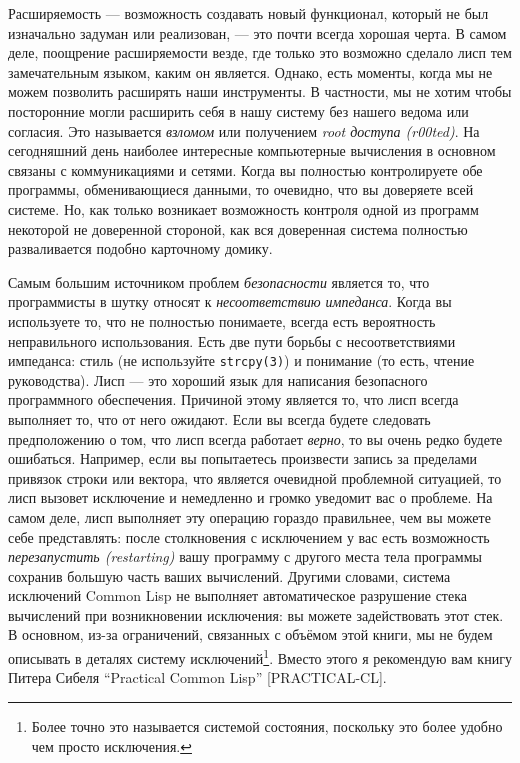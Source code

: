 Расширяемость --- возможность создавать новый функционал, который не был изначально задуман или реализован, --- это почти всегда хорошая черта. В самом деле, поощрение расширяемости везде, где только это возможно сделало лисп тем замечательным языком, каким он является. Однако, есть моменты, когда мы не можем позволить расширять наши инструменты. В частности, мы не хотим чтобы посторонние могли расширить себя в нашу систему без нашего ведома или согласия. Это называется \emph{взломом} или получением \emph{root доступа (r00ted)}. На сегодняшний день наиболее интересные компьютерные вычисления в основном связаны с коммуникациями и сетями. Когда вы полностью контролируете обе программы, обменивающиеся данными, то очевидно, что вы доверяете всей системе. Но, как только возникает возможность контроля одной из программ некоторой не доверенной стороной, как вся доверенная система полностью разваливается подобно карточному домику.

Самым большим источником проблем \emph{безопасности} является то, что программисты в шутку относят к \emph{несоответствию импеданса}. Когда вы используете то, что не полностью понимаете, всегда есть вероятность неправильного использования. Есть две пути борьбы с несоответствиями импеданса: стиль (не используйте \verb"strcpy(3)") и понимание (то есть, чтение руководства). Лисп --- это хороший язык для написания безопасного программного обеспечения. Причиной этому является то, что лисп всегда выполняет то, что от него ожидают. Если вы всегда будете следовать предположению о том, что лисп всегда работает \emph{верно}, то вы очень редко будете ошибаться. Например, если вы попытаетесь произвести запись за пределами привязок строки или вектора, что является очевидной проблемной ситуацией, то лисп вызовет исключение и немедленно и громко уведомит вас о проблеме. На самом деле, лисп выполняет эту операцию гораздо правильнее, чем вы можете себе представлять: после столкновения с исключением у вас есть возможность \emph{перезапустить (restarting)} вашу программу с другого места тела программы сохранив большую часть ваших вычислений. Другими словами, система исключений Common Lisp не выполняет автоматическое разрушение стека вычислений при возникновении исключения: вы можете задействовать этот стек. В основном, из-за ограничений, связанных с объёмом этой книги, мы не будем описывать в деталях систему исключений\footnote{Более точно это называется системой состояния, поскольку это более удобно чем просто исключения.}. Вместо этого я рекомендую вам книгу Питера Сибеля ``Practical Common Lisp'' [PRACTICAL-CL].

